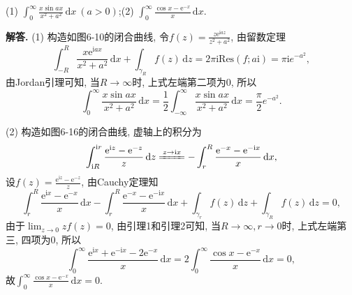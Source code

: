 \documentclass[12pt, a4paper, oneside]{ctexart}
\newenvironment{solution}{\par\noindent\textbf{解答. }}{\bigskip\par}
\def\res{\text{Res}}
\def\d{\mathrm{d}}      %
\def\e{\mathrm{e}}      %
\def\i{\mathrm{i}}      %
\def\add{\vspace{1ex}}  %
\begin{document}
(1) $\int_{0}^\infty\frac{x\sin ax}{x^2+a^2}\,\d x\ (a > 0)$;\qquad (2) $\int_0^{\infty}\frac{\cos x-\e^{-x}}{x}\,\d x$.\add
\begin{solution}
    (1) 构造如图6-10的闭合曲线, 令$f(z) = \frac{z\e^{\i az}}{z^2+a^2}$, 由留数定理
    \begin{equation*}
        \int_{-R}^R\frac{x\e^{\i ax}}{x^2+a^2}\,\d x+\int_{\gamma_R}f(z)\,\d z = 2\pi \i\res\left(f;a\i\right) = \pi\i e^{-a^2},
    \end{equation*}
    由Jordan引理可知, 当$R\to\infty$时, 上式左端第二项为$0$, 所以
    \begin{equation*}
        \int_0^\infty\frac{x\sin ax}{x^2+a^2}\,\d x =\frac{1}{2}\int_{-\infty}^\infty\frac{x\sin ax}{x^2+a^2}\,\d x= \frac{\pi}{2}e^{-a^2}.
    \end{equation*}

    (2) 构造如图6-16的闭合曲线, 虚轴上的积分为
    \begin{equation*}
        \int_{\i R}^{\i r}\frac{\e^{\i z}-\e^{-z}}{z}\,\d z\xlongequal{z\to \i x}-\int_r^R\frac{\e^{-x}-\e^{-\i x}}{x}\,\d x,
    \end{equation*}
    设$f(z) = \frac{\e^{\i z}-\e^{-z}}{z}$, 由Cauchy定理知
    \begin{equation*}
        \int_r^R\frac{\e^{\i x}-\e^{-x}}{x}\,\d x -\int_r^R\frac{\e^{-x}-\e^{-\i x}}{x}\,\d x+\int_{\gamma_r}f(z)\,\d z+\int_{\gamma_R}f(z)\,\d z = 0,
    \end{equation*}
    由于$\lim_{z\to 0}zf(z) = 0$, 由引理1和引理2可知, 当$R\to\infty, r\to0$时, 上式左端第三, 四项为0, 所以
    \begin{equation*}
        \int_0^\infty \frac{\e^{\i x}+\e^{-\i x}-2\e^{-x}}{x}\,\d x = 2\int_0^\infty\frac{\cos x-\e^{-x}}{x}\,\d x =0,
    \end{equation*}
    故$\int_0^\infty\frac{\cos x-\e^{-x}}{x}\,\d x =0$.
\end{solution}
\end{document}
